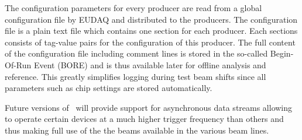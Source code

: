The configuration parameters for every producer are read from a global configuration file by EUDAQ and distributed to the producers. The configuration file is a plain text file which contains one section for each producer. Each sections consists of tag-value pairs for the configuration of this producer. The full content of the configuration file including comment lines is stored in the so-called Begin-Of-Run Event (BORE) and is thus available later for offline analysis and reference. This greatly simplifies logging during test beam shifts since all parameters such as chip settings are stored automatically.


Future versions of \eudaq\ will provide support for asynchronous data streams allowing to operate certain devices at a much higher trigger frequency than others and thus making full use of the the beams available in the various beam lines.
